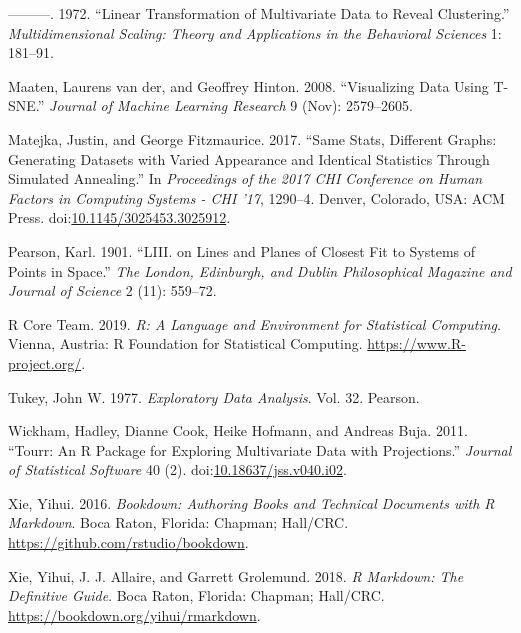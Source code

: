 \documentclass[11,]{article}
\theoremstyle{definition}
\theoremstyle{definition}
\theoremstyle{definition}
\theoremstyle{remark}
\begin{document}
\hypertarget{ref-kruskal_linear_1972}{}
---------. 1972. ``Linear Transformation of Multivariate Data to Reveal
Clustering.'' \emph{Multidimensional Scaling: Theory and Applications in
the Behavioral Sciences} 1: 181--91.

\hypertarget{ref-maaten_visualizing_2008}{}
Maaten, Laurens van der, and Geoffrey Hinton. 2008. ``Visualizing Data
Using T-SNE.'' \emph{Journal of Machine Learning Research} 9 (Nov):
2579--2605.

\hypertarget{ref-matejka_same_2017}{}
Matejka, Justin, and George Fitzmaurice. 2017. ``Same Stats, Different
Graphs: Generating Datasets with Varied Appearance and Identical
Statistics Through Simulated Annealing.'' In \emph{Proceedings of the
2017 CHI Conference on Human Factors in Computing Systems - CHI '17},
1290--4. Denver, Colorado, USA: ACM Press.
doi:\href{https://doi.org/10.1145/3025453.3025912}{10.1145/3025453.3025912}.

\hypertarget{ref-pearson_liii._1901}{}
Pearson, Karl. 1901. ``LIII. on Lines and Planes of Closest Fit to
Systems of Points in Space.'' \emph{The London, Edinburgh, and Dublin
Philosophical Magazine and Journal of Science} 2 (11): 559--72.

\hypertarget{ref-r_core_team_r:_2019}{}
R Core Team. 2019. \emph{R: A Language and Environment for Statistical
Computing}. Vienna, Austria: R Foundation for Statistical Computing.
\url{https://www.R-project.org/}.

\hypertarget{ref-tukey_exploratory_1977}{}
Tukey, John W. 1977. \emph{Exploratory Data Analysis}. Vol. 32. Pearson.

\hypertarget{ref-wickham_tourr:_2011}{}
Wickham, Hadley, Dianne Cook, Heike Hofmann, and Andreas Buja. 2011.
``Tourr: An R Package for Exploring Multivariate Data with
Projections.'' \emph{Journal of Statistical Software} 40 (2).
doi:\href{https://doi.org/10.18637/jss.v040.i02}{10.18637/jss.v040.i02}.

\hypertarget{ref-xie_bookdown:_2016}{}
Xie, Yihui. 2016. \emph{Bookdown: Authoring Books and Technical
Documents with R Markdown}. Boca Raton, Florida: Chapman; Hall/CRC.
\url{https://github.com/rstudio/bookdown}.

\hypertarget{ref-xie_r_2018}{}
Xie, Yihui, J. J. Allaire, and Garrett Grolemund. 2018. \emph{R
Markdown: The Definitive Guide}. Boca Raton, Florida: Chapman; Hall/CRC.
\url{https://bookdown.org/yihui/rmarkdown}.
\end{document}
